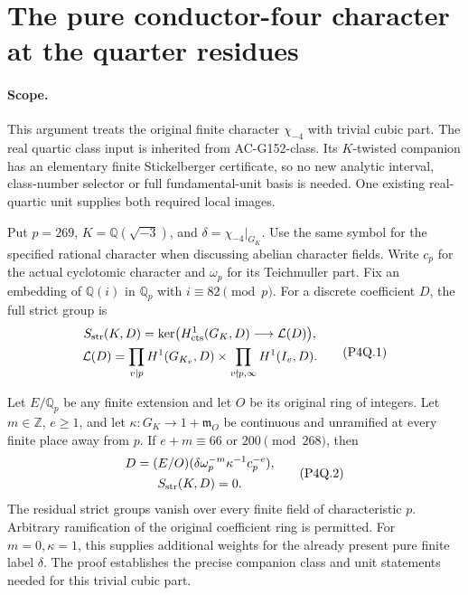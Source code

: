 \section{The pure conductor-four character at the quarter residues}
\label{sec:pure-conductor4-quartic-strict}

\paragraph{Scope.}
This argument treats the original finite character $\chi_{-4}$
with trivial cubic part.  The real quartic class input is inherited
from AC-G152-class.  Its $K$-twisted companion has an elementary
finite Stickelberger certificate, so no new analytic interval,
class-number selector or full fundamental-unit basis is needed.
One existing real-quartic unit supplies both required local images.

Put $p=269$, $K=\mathbb Q(\sqrt{-3})$, and
$\delta=\chi_{-4}|_{G_K}$.
Use the same symbol for the specified rational character when
discussing abelian character fields.
Write $c_p$ for the actual cyclotomic character and $\omega_p$
for its Teichmuller part.  Fix an embedding of $\mathbb Q(i)$
in $\mathbb Q_p$ with $i\equiv82\pmod p$.
For a discrete coefficient $D$, the full strict group is
\[
 \begin{gathered}
 S_{\rm str}(K,D)=\ker\bigl(H^1_{\rm cts}(G_K,D)
                                  \longrightarrow\mathcal L(D)\bigr),\\
 \mathcal L(D)=\prod_{v\mid p}H^1(G_{K_v},D)
              \times\prod_{v\nmid p,\infty}H^1(I_v,D).
 \end{gathered}
 \tag{P4Q.1}
\]

\begin{theorem}
\label{AC-G162}
Let $E/\mathbb Q_p$ be any finite extension and let $O$ be its
original ring of integers.  Let $m\in\mathbb Z$, $e\geq1$, and
let $\kappa:G_K\to1+\mathfrak m_O$ be continuous and unramified
at every finite place away from $p$.
If $e+m\equiv66$ or $200\pmod{268}$, then
\[
 \begin{gathered}
 D=(E/O)(\delta\omega_p^{-m}\kappa^{-1}c_p^{-e}),\\
                         S_{\rm str}(K,D)=0.
 \end{gathered}
 \tag{P4Q.2}
\]
The residual strict groups vanish over every finite field of
characteristic $p$.  Arbitrary ramification of the original
coefficient ring is permitted.
For $m=0,\kappa=1$, this supplies additional weights for the
already present pure finite label $\delta$.
The proof establishes the precise companion class and unit
statements needed for this trivial cubic part.
\end{theorem}

